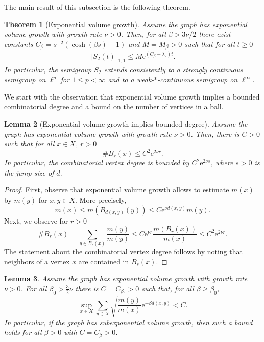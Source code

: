 \documentclass[10pt]{amsart}
\newtheorem{theorem}{Theorem}[section]
\newtheorem{lemma}[theorem]{Lemma}
\theoremstyle{definition}
\begin{document}
The main result of this subsection is the following theorem.
\begin{theorem}[Exponential volume growth]\label{lpextend}
    Assume the graph   has exponential volume growth with growth rate $\nu>0$. Then,    for all $\beta>3\nu\slash 2$ there exist constants
     $C_\beta = s^{-2}(\cosh(\beta s)-1)$ and $M=M_\beta>0$ such that for all $t\geq 0$  
\begin{align*}
        \Vert S_2(t) \Vert_{1,1} \leq M\mathrm{e}^{(C_\beta-\lambda_2) t}.
    \end{align*}
In particular,
    the semigroup $S_2$ extends consistently to a strongly continuous semigroup  on $\ell^p$ for $1\leq p<\infty$ and to a weak-$\ast$-continuous semigroup on $\ell^\infty.$ 
\end{theorem}



We start with the observation that exponential volume growth implies a bounded combinatorial degree and a bound on the number of vertices in a ball.

\begin{lemma}[Exponential volume growth implies bounded degree]\label{LemmaCombVolGrowth}
    Assume the graph   has exponential volume growth with growth rate $\nu>0$. Then, there is $C>0$ such that for all $x\in X$,    $r>0$
 \[\# B_r(x)  \leq C^2\mathrm{e}^{2\nu r}.\]
    In particular, the combinatorial vertex degree is bounded by $C^2\mathrm{e}^{2\nu s}$, where $s>0$ is the jump size of $d.$
\end{lemma}
\begin{proof}
    First, observe that exponential volume growth allows to estimate $m(x)$ by $m(y)$ for $x,y\in X.$ More precisely,
    \[m(x)\leq m(B_{d(x,y)}(y))\leq C\mathrm{e}^{\nu d(x,y)}m(y).\]
    Next, we observe for $r>0$
    \[\# B_r(x) = \sum_{y\in B_r(x)}\frac{m(y)}{m(y)}\leq C\mathrm{e}^{\nu r}\frac{m(B_r(x))}{m(x)}\leq C^2\mathrm{e}^{2\nu r}.\]
    The statement about the combinatorial vertex degree follows by noting that neighbors of a vertex $x$ are contained in $B_s(x)$.%
\end{proof}



\begin{lemma}\label{LemmaVolGrowth}
    Assume the graph  has exponential volume growth with growth rate $\nu>0$. For all  $\beta_0>\frac{3}{2}\nu$  there is $C=C_{\beta_0}>0$ such that, for all $\beta\geq\beta_0$,
    \[\sup_{x\in X}\sum_{y\in X}\sqrt{\frac{m(y)}{m(x)}}\mathrm{e}^{-\beta d(x,y)}<C.\]
    In particular, if the graph has subexponential volume growth, then such a bound holds for all $\beta>0$ with $C=C_\beta>0$.
\end{lemma}
\end{document}
